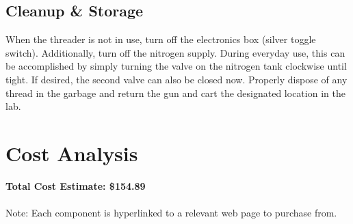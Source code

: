 \documentclass[letterpaper,12pt]{article}
\begin{document}
\subsection{Cleanup \& Storage}
When the threader is not in use, turn off the electronics box (silver toggle switch). Additionally, turn off the nitrogen supply. During everyday use, this can be accomplished by simply turning the valve on the nitrogen tank clockwise until tight. If desired, the second valve can also be closed now. Properly dispose of any thread in the garbage and return the gun and cart the designated location in the lab.


\section{Cost Analysis} \textbf{Total Cost Estimate: \large{\$154.89}} \\ \\
Note: Each component is hyperlinked to a relevant web page to purchase from.
\end{document}
